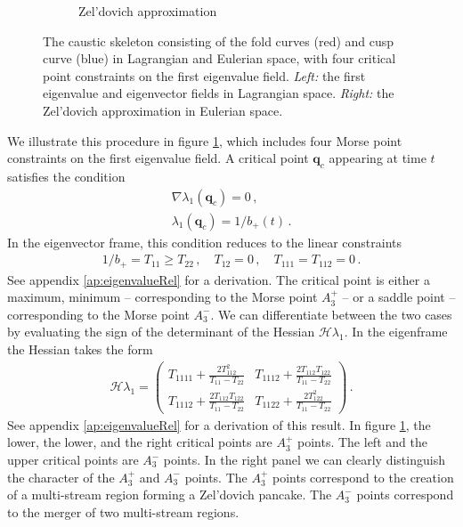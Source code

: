 \documentclass[a4paper, 11pt]{article}
\begin{document}
\begin{figure}
\begin{subfigure}[b]{0.49\textwidth}
\caption{Zel'dovich approximation}
\end{subfigure}
\caption{The caustic skeleton consisting of the fold curves (red) and cusp curve (blue) in Lagrangian and Eulerian space, with four critical point constraints on the first eigenvalue field. \textit{Left:} the first eigenvalue and eigenvector fields in Lagrangian space. \textit{Right:} the Zel'dovich approximation in Eulerian space.}\label{fig:composite}
\end{figure}

We illustrate this procedure in figure \ref{fig:composite}, which includes four Morse point constraints on the first eigenvalue field. A critical point $\bm{q}_c$ appearing at time $t$ satisfies the condition
\begin{align}
\nabla \lambda_1(\bm{q}_c) = 0\,,\\
\lambda_1(\bm{q}_c)=1/b_+(t)\,.
\end{align}
In the eigenvector frame, this condition reduces to the linear constraints
\begin{align}
1/b_+ = T_{11} \geq T_{22}\,, \quad  T_{12}=0\,,\quad T_{111}=T_{112}=0\,.
\end{align}
See appendix \ref{ap:eigenvalueRel} for a derivation. The critical point is either a maximum, minimum -- corresponding to the Morse point $A_3^+$ -- or a saddle point -- corresponding to the Morse point $A_3^-$. We can differentiate between the two cases by evaluating the sign of the determinant of the Hessian $\mathcal{H}\lambda_1$. In the eigenframe the Hessian takes the form
\begin{align}
\mathcal{H}\lambda_1 = 
\begin{pmatrix} 
T_{1111}+\frac{2T_{112}^2}{T_{11}-T_{22}} & T_{1112} + \frac{2 T_{112}T_{122}}{T_{11}-T_{22}} \\
T_{1112}+\frac{2 T_{112}T_{122}}{T_{11}-T_{22}} & T_{1122} + \frac{2 T_{122}^2}{T_{11}-T_{22}}
\end{pmatrix}\,.
\end{align}
See appendix \ref{ap:eigenvalueRel} for a derivation of this result. In figure \ref{fig:composite}, the lower, the lower, and the right critical points are $A_3^+$ points. The left and the upper critical points are $A_3^-$ points. In the right panel we can clearly distinguish the character of the $A_3^+$ and $A_3^-$ points. The $A_3^+$ points correspond to the creation of a multi-stream region forming a Zel'dovich pancake. The $A_3^-$ points correspond to the merger of two multi-stream regions.
\end{document}
